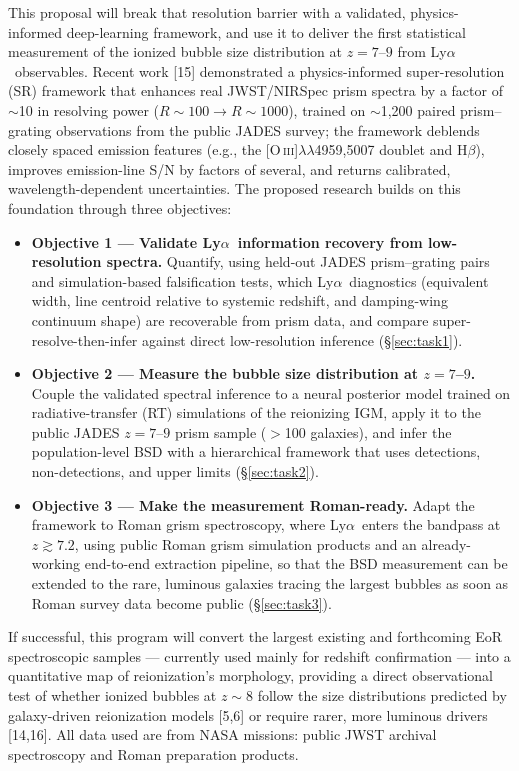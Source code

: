 \documentclass[12pt,letterpaper]{article}
\newcommand{\lya}{Ly$\alpha$}
\begin{document}
This proposal will break that resolution barrier with a validated,
physics-informed deep-learning framework, and use it to deliver the first
statistical measurement of the ionized bubble size distribution at
$z=7$--$9$ from \lya\ observables. Recent work [15] demonstrated a
physics-informed super-resolution (SR) framework that enhances real
JWST/NIRSpec prism spectra by a factor of $\sim$10 in resolving power
($R\sim100\rightarrow R\sim1000$), trained on $\sim$1,200 paired
prism--grating observations from the public JADES survey; the framework
deblends closely spaced emission features (e.g., the
[O\,\textsc{iii}]$\lambda\lambda$4959,5007 doublet and H$\beta$),
improves emission-line S/N by factors of several, and returns calibrated,
wavelength-dependent uncertainties. The proposed research builds on this
foundation through three objectives:

\begin{itemize}\setlength\itemsep{1pt}
\item \textbf{Objective 1 --- Validate \lya\ information recovery from
low-resolution spectra.} Quantify, using held-out JADES prism--grating
pairs and simulation-based falsification tests, which \lya\ diagnostics
(equivalent width, line centroid relative to systemic redshift, and
damping-wing continuum shape) are recoverable from prism data, and
compare super-resolve-then-infer against direct low-resolution inference
(\S\ref{sec:task1}).
\item \textbf{Objective 2 --- Measure the bubble size distribution at
$z=7$--$9$.} Couple the validated spectral inference to a neural
posterior model trained on radiative-transfer (RT) simulations of the
reionizing IGM, apply it to the public JADES $z=7$--$9$ prism sample
($>$100 galaxies), and infer the population-level BSD with a hierarchical
framework that uses detections, non-detections, and upper limits
(\S\ref{sec:task2}).
\item \textbf{Objective 3 --- Make the measurement Roman-ready.} Adapt
the framework to Roman grism spectroscopy, where \lya\ enters the
bandpass at $z\gtrsim7.2$, using public Roman grism simulation products
and an already-working end-to-end extraction pipeline, so that the BSD
measurement can be extended to the rare, luminous galaxies tracing the
largest bubbles as soon as Roman survey data become public
(\S\ref{sec:task3}).
\end{itemize}

If successful, this program will convert the largest existing and
forthcoming EoR spectroscopic samples --- currently used mainly for
redshift confirmation --- into a quantitative map of reionization's
morphology, providing a direct observational test of whether ionized
bubbles at $z\sim8$ follow the size distributions predicted by
galaxy-driven reionization models [5,6] or require rarer, more luminous
drivers [14,16]. All data used are from NASA missions: public JWST
archival spectroscopy and Roman preparation products.
\end{document}

